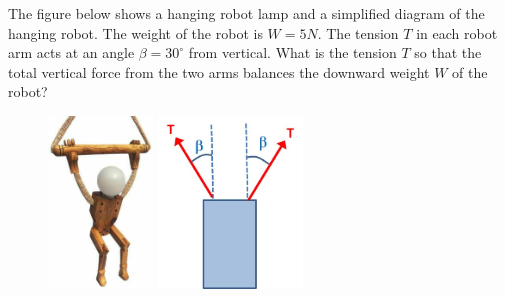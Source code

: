 
The figure below shows a hanging robot lamp and a simplified diagram of the hanging robot. The weight of the robot is $W = 5N$. The tension $T$ in each robot arm acts at an angle $\beta = 30^\circ$ from vertical. What is the tension $T$ so that the total vertical force from the two arms balances the downward weight $W$ of the robot?

\begin{figure}[ht!]
  \centering
  \includegraphics[height=1.8in]{robot-lamp.png}
  \includegraphics[height=1.8in]{robot-lamp-diagram.png}
\end{figure}

